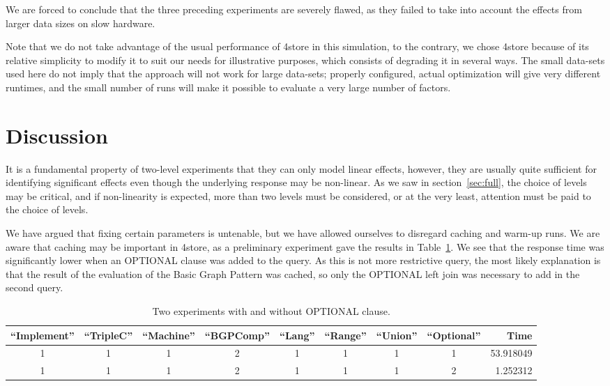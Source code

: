 \documentclass{llncs}
\begin{document}
We are forced to conclude that the three preceding experiments are
severely flawed, as they failed to take into account the effects from
larger data sizes on slow hardware.


Note that we do not take advantage of the usual performance of 4store
in this simulation, to the contrary, we chose 4store because of its
relative simplicity to modify it to suit our needs for illustrative
purposes, which consists of degrading it in several ways. The small
data-sets used here do not imply that the approach will not work for
large data-sets; properly configured, actual optimization will give
very different runtimes, and the small number of runs will make it
possible to evaluate a very large number of factors.



\section{Discussion}

It is a fundamental property of two-level experiments that they can
only model linear effects, however, they are usually quite sufficient
for identifying significant effects even though the underlying
response may be non-linear.  As we saw in section~\ref{sec:full}, the
choice of levels may be critical, and if non-linearity is expected,
more than two levels must be considered, or at the very least,
attention must be paid to the choice of levels.

We have argued that fixing certain parameters is untenable, but we
have allowed ourselves to disregard caching and warm-up runs. We are
aware that caching may be important in 4store, as a preliminary
experiment gave the results in Table~\ref{tab:cacheexp}. We see that the
response time was significantly lower when an OPTIONAL clause was
added to the query. As this is not more restrictive query, the most
likely explanation is that the result of the evaluation of the Basic
Graph Pattern was cached, so only the OPTIONAL left join was necessary
to add in the second query.

\begin{table}[ht]
\begin{center}
\caption{Two experiments with and without OPTIONAL clause.}\label{tab:cacheexp}
\begin{tabular}{ccccccccr}
  \hline
``Implement'' & ``TripleC'' & ``Machine'' & ``BGPComp'' & ``Lang'' & ``Range'' & ``Union'' & ``Optional'' & Time \\
 \hline
1   &    1  &     1  &     2 &   1 &    1   &  1  & 1 &  53.918049 \\
1   &    1  &     1  &     2 &   1 &    1   &  1  & 2 &   1.252312 \\
   \hline
\end{tabular}
\end{center}
\end{table}
\end{document}
